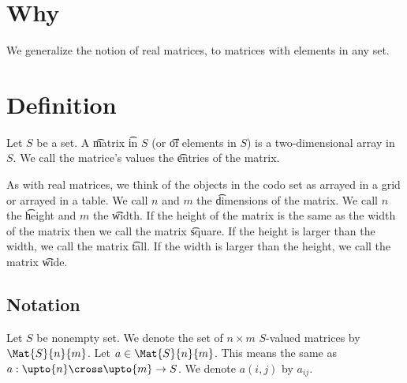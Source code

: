 
\section*{Why}

We generalize the notion of real matrices, to matrices with elements in any set.

\section*{Definition}

Let $S$ be a set.
A \t{matrix} \t{in} $S$ (or \t{of} elements in $S$) is a two-dimensional array in $S$.
We call the matrice's values the \t{entries} of the matrix.

As with real matrices, we think of the objects in the codo set as arrayed in a grid or arrayed in a table.
We call $n$ and $m$ the \t{dimensions} of the matrix.
We call $n$ the \t{height} and $m$ the \t{width}.
If the height of the matrix is the same as the width of the matrix then we call the matrix \t{square}.
If the height is larger than the width, we call the matrix \t{tall}.
If the width is larger than the height, we call the matrix \t{wide}.

\subsection*{Notation}

Let $S$ be nonempty set.
We denote the set of $n \times  m$ $S$-valued matrices by $\Mat{S}{n}{m}$.
Let $a \in \Mat{S}{n}{m}$.
This means the same as $a: \upto{n} \cross \upto{m} \to S$.
We denote $a(i, j)$ by $a_{ij}$.

\blankpage